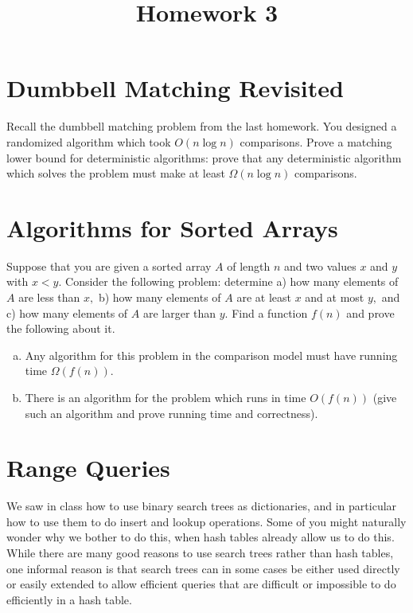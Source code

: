 \documentclass{article}
\begin{document}
\title{Homework 3}
\maketitle
\thispagestyle{fancy}

\section{Dumbbell Matching Revisited}

Recall the dumbbell matching problem from the last homework. You designed a randomized algorithm which took $O(n\log n)$ comparisons. Prove a matching lower bound for deterministic algorithms: prove that any deterministic algorithm which solves the problem must make at least $\Omega(n\log n)$ comparisons.

\section{Algorithms for Sorted Arrays}

Suppose that you are given a sorted array $A$ of length $n$ and two values $x$ and $y$ with $x<y.$ Consider the following problem: determine a) how many elements of $A$ are less than $x,$ b) how many elements of $A$ are at least $x$ and at most $y,$ and c) how many elements of $A$ are larger than $y.$ Find a function $f(n)$ and prove the following about it.
\begin{enumerate}[(a)]
	\item Any algorithm for this problem in the comparison model must have running time $\Omega(f(n)).$

	\item There is an algorithm for the problem which runs in time $O(f(n))$ (give such an algorithm and prove running time and correctness).

\end{enumerate}

\section{Range Queries}

We saw in class how to use binary search trees as dictionaries, and in particular how to use them to do insert and lookup operations. Some of you might naturally wonder why we bother to do this, when hash tables already allow us to do this. While there are many good reasons to use search trees rather than hash tables, one informal reason is that search trees can in some cases be either used directly or easily extended to allow efficient queries that are difficult or impossible to do efficiently in a hash table.
\end{document}
